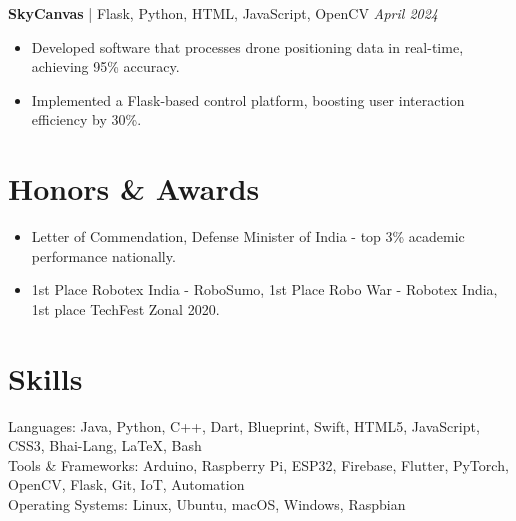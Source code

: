 \documentclass[a4paper,10pt]{article}
\begin{document}
\textbf{SkyCanvas} | Flask, Python, HTML, JavaScript, OpenCV \hfill \textit{April 2024} \\
\begin{itemize}[leftmargin=*]
    \item Developed software that processes drone positioning data in real-time, achieving 95\% accuracy.
    \item Implemented a Flask-based control platform, boosting user interaction efficiency by 30\%.
\end{itemize}

\section*{Honors \& Awards}
\begin{itemize}[leftmargin=*]
    \item Letter of Commendation, Defense Minister of India - top 3\% academic performance nationally.
    \item 1st Place Robotex India - RoboSumo, 1st Place Robo War - Robotex India, 1st place TechFest Zonal 2020.
\end{itemize}

\section*{Skills}
Languages: Java, Python, C++, Dart, Blueprint, Swift, HTML5, JavaScript, CSS3, Bhai-Lang, LaTeX, Bash \\
Tools \& Frameworks: Arduino, Raspberry Pi, ESP32, Firebase, Flutter, PyTorch, OpenCV, Flask, Git, IoT, Automation \\
Operating Systems: Linux, Ubuntu, macOS, Windows, Raspbian \\
\end{document}
